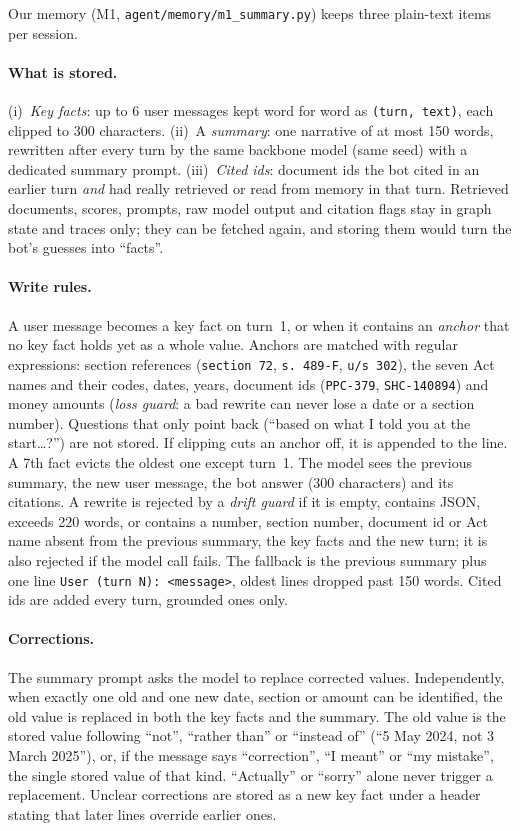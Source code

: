 Our memory (M1, \texttt{agent/memory/m1\_summary.py}) keeps three plain-text items per session.

\paragraph{What is stored.}
(i)~\emph{Key facts}: up to 6 user messages kept word for word as \texttt{(turn, text)}, each clipped
to 300 characters. (ii)~A \emph{summary}: one narrative of at most 150 words, rewritten after every
turn by the same backbone model (same seed) with a dedicated summary prompt. (iii)~\emph{Cited ids}:
document ids the bot cited in an earlier turn \emph{and} had really retrieved or read from memory in
that turn. Retrieved documents, scores, prompts, raw model output and citation flags stay in graph
state and traces only; they can be fetched again, and storing them would turn the bot's guesses into
``facts''.

\paragraph{Write rules.}
A user message becomes a key fact on turn~1, or when it contains an \emph{anchor} that no key fact
holds yet as a whole value. Anchors are matched with regular expressions: section references
(\texttt{section 72}, \texttt{s.~489-F}, \texttt{u/s 302}), the seven Act names and their codes,
dates, years, document ids (\texttt{PPC-379}, \texttt{SHC-140894}) and money amounts
(\emph{loss guard}: a bad rewrite can never lose a date or a section number). Questions that only
point back (``based on what I told you at the start\ldots?'') are not stored. If clipping cuts an
anchor off, it is appended to the line. A 7th fact evicts the oldest one except turn~1.
The model sees the previous summary, the new user message, the bot answer (300 characters) and its
citations. A rewrite is rejected by a \emph{drift guard} if it is empty, contains JSON, exceeds 220
words, or contains a number, section number, document id or Act name absent from the previous
summary, the key facts and the new turn; it is also rejected if the model call fails. The fallback
is the previous summary plus one line \texttt{User (turn N): <message>}, oldest lines dropped past
150 words. Cited ids are added every turn, grounded ones only.

\paragraph{Corrections.}
The summary prompt asks the model to replace corrected values. Independently, when exactly one old and
one new date, section or amount can be identified, the old value is replaced in both the key facts and
the summary. The old value is the stored value following ``not'', ``rather than'' or ``instead of''
(``5 May 2024, not 3 March 2025''), or, if the message says ``correction'', ``I meant'' or ``my
mistake'', the single stored value of that kind. ``Actually'' or ``sorry'' alone never trigger a
replacement. Unclear corrections are stored as a new key fact under a header stating that later lines
override earlier ones.

